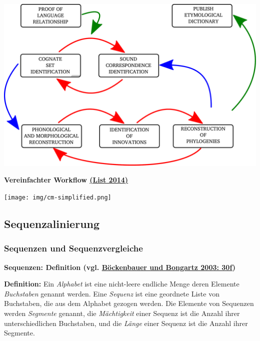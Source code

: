 \includegraphics[width=\textwidth]{img/ross-durie-workflow.pdf}



\vspace{0.5cm}\par\noindent\textbf{Vereinfachter Workflow\vspace{0.5cm}
\href{http://bibliography.lingpy.org?key=List2014d}{(List 2014)}}

\texttt{[image: img/cm-simplified.png]}

\subsection{\texorpdfstring{{Sequenzalinierung}}{Sequenzalinierung}}

\subsubsection{\texorpdfstring{{Sequenzen und
Sequenzvergleiche}}{Sequenzen und Sequenzvergleiche}}

\vspace{0.5cm}\par\noindent\textbf{Sequenzen: Definition (vgl.\vspace{0.5cm}
\href{http://bibliography.lingpy.org?key=Boeckenbauer2003}{Böckenbauer
und Bongartz 2003: 30f})}

\vspace{0.5cm}\par\noindent\textbf{Definition:} Ein \emph{Alphabet} ist eine nicht-leere endliche\vspace{0.5cm}
Menge deren Elemente \emph{Buchstaben} genannt werden. Eine
\emph{Sequenz} ist eine geordnete Liste von Buchstaben, die aus dem
Alphabet gezogen werden. Die Elemente von Sequenzen werden
\emph{Segmente} genannt, die \emph{Mächtigkeit} einer Sequenz ist die
Anzahl ihrer unterschiedlichen Buchstaben, und die \emph{Länge} einer
Sequenz ist die Anzahl ihrer Segmente.



